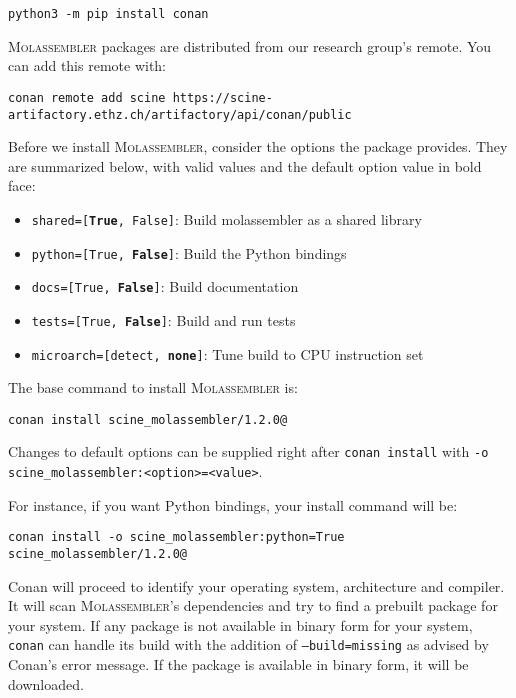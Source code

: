 \documentclass[]{tufte-book}
\begin{document}
\begin{Verbatim}
python3 -m pip install conan
\end{Verbatim}

\textsc{Molassembler} packages are distributed from our research group's remote.
You can add this remote with:

\begin{Verbatim}
conan remote add scine https://scine-artifactory.ethz.ch/artifactory/api/conan/public
\end{Verbatim}

Before we install \textsc{Molassembler}, consider the options the package 
provides. They are summarized below, with valid values and the default option
value in bold face:

\begin{itemize} 
  \item \texttt{shared=[\textbf{True}, False]}: Build molassembler as a shared
    library
  \item \texttt{python=[True, \textbf{False}]}: Build the Python bindings
  \item \texttt{docs=[True, \textbf{False}]}: Build documentation
  \item \texttt{tests=[True, \textbf{False}]}: Build and run tests
  \item \texttt{microarch=[detect, \textbf{none}]}: Tune build to CPU
    instruction set
\end{itemize}

The base command to install \textsc{Molassembler} is:

\begin{Verbatim}
conan install scine_molassembler/1.2.0@
\end{Verbatim}

Changes to default options can be supplied right after \texttt{conan install}
with \texttt{-o scine\_molassembler:<option>=<value>}.

For instance, if you want Python bindings, your install command will be:

\begin{Verbatim}
conan install -o scine_molassembler:python=True scine_molassembler/1.2.0@
\end{Verbatim}

Conan will proceed to identify your operating system, architecture and compiler.
It will scan \textsc{Molassembler}'s dependencies and try to find a prebuilt
package for your system. If any package is not available in binary form for your
system, \texttt{conan} can handle its build with the addition of
\texttt{--build=missing} as advised by Conan's error message. If the package is
available in binary form, it will be downloaded.
\end{document}
